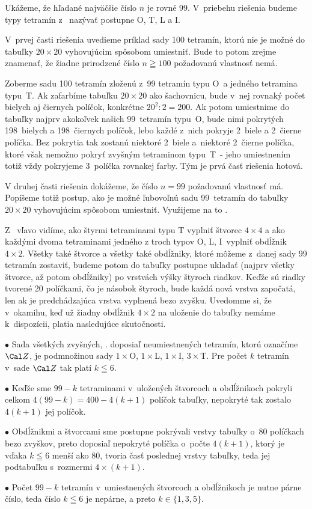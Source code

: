 {%
Ukážeme, že hľadané najväčšie číslo $n$ je rovné 99.
V~priebehu riešenia budeme typy tetramín z~ nazývať
postupne O, T, L a I.

V~prvej časti riešenia uvedieme príklad sady 100 tetramín, ktorú
nie je možné do tabuľky $20\times20$ vyhovujúcim spôsobom umiestniť. Bude
to potom zrejme znamenať, že žiadne prirodzené číslo $n\geqq100$
požadovanú vlastnosť nemá.

Zoberme sadu 100 tetramín zloženú z~99 tetramín typu O~a jedného
tetramina typu~T. Ak zafarbíme tabuľku $20\times20$
ako šachovnicu, bude v~nej rovnaký počet bielych aj čiernych políčok,
konkrétne $20^2:2=200$.
Ak potom umiestnime do tabuľky najprv akokoľvek našich
99~tetramín typu~O, bude nimi pokrytých 198~bielych a 198~čiernych políčok,
lebo každé z~nich pokryje 2~biele a 2~čierne políčka. Bez pokrytia
tak zostanú niektoré 2~biele a~niektoré 2~čierne políčka, ktoré však nemožno pokryť
zvyšným tetraminom typu~T~- jeho umiestnením totiž vždy pokryjeme
3~políčka rovnakej farby. Tým je prvá časť riešenia hotová.

\smallskip
V druhej časti riešenia dokážeme, že číslo $n=99$ požadovanú
vlastnosť má. Popíšeme totiž postup, ako je možné ľubovoľnú sadu
99~tetramín do tabuľky $20\times20$ vyhovujúcim spôsobom umiestniť.
Využijeme na to \obr.
%

Z~ vľavo vidíme, ako štyrmi tetraminami typu T vyplniť
štvorec $4\times 4$ a ako každými dvoma tetraminami
jedného z troch typov O, L, I~vyplniť obdĺžnik~$4\times 2$.
Všetky také štvorce a všetky také obdĺžniky,
ktoré môžeme z~danej sady 99 tetramín zostaviť,
budeme potom do tabuľky postupne ukladať (najprv všetky štvorce,
až potom obdĺžniky) po vrstvách výšky štyroch riadkov.
Keďže sú riadky tvorené 20 políčkami, čo je násobok štyroch,
bude každá nová vrstva započatá, len ak je predchádzajúca vrstva
vyplnená bezo zvyšku. Uvedomme si, že v~okamihu, keď
už žiadny obdĺžnik $4\times2$ na uloženie do tabuľky
nemáme k~dispozícii, platia nasledujúce skutočnosti.

\smallskip
\item{$\bullet$} Sada všetkých zvyšných, \tj. doposiaľ neumiestnených tetramín,
ktorú označíme $\Cal Z$, je podmnožinou sady
$1\times$O, $1\times$L, $1\times$I, $3\times$T.
Pre počet $k$ tetramín v~sade $\Cal Z$ tak platí $k\leqq6$.
\item{$\bullet$} Keďže sme $99-k$ tetraminami v~uložených
štvorcoch a obdĺžnikoch pokryli celkom
$4(99-k)=400-4(k+1)$ políčok tabuľky, nepokryté tak
zostalo $4(k+1)$ jej políčok.
\item{$\bullet$} Obdĺžnikmi a štvorcami sme postupne pokrývali vrstvy tabuľky
o~80 políčkach bezo zvyškov, preto doposiaľ nepokryté políčka
o~počte $4(k+1)$, ktorý je vďaka $k\leqq6$ menší ako 80,
tvoria časť poslednej vrstvy tabuľky, teda jej podtabuľku
s~rozmermi $4\times(k+1)$.
\item{$\bullet$} Počet $99-k$ tetramín v~umiestnených štvorcoch a obdĺžnikoch je nutne párne
číslo, teda číslo $k\leqq6$ je nepárne, a preto $k\in\{1,3,5\}$.

}
